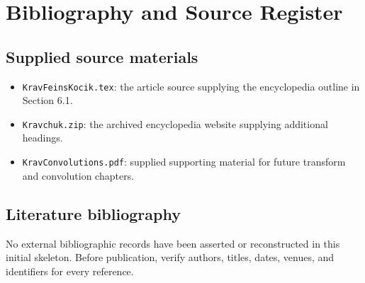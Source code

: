 \documentclass[11pt,oneside]{amsbook}
\theoremstyle{definition}
\theoremstyle{remark}
\begin{document}
\chapter*{Bibliography and Source Register}
\section*{Supplied source materials}
\begin{itemize}
\item \texttt{KravFeinsKocik.tex}: the article source supplying the encyclopedia outline in Section 6.1.
\item \texttt{Kravchuk.zip}: the archived encyclopedia website supplying additional headings.
\item \texttt{KravConvolutions.pdf}: supplied supporting material for future transform and convolution chapters.
\end{itemize}
\section*{Literature bibliography}
No external bibliographic records have been asserted or reconstructed in this initial skeleton. Before publication, verify authors, titles, dates, venues, and identifiers for every reference.
\end{document}
